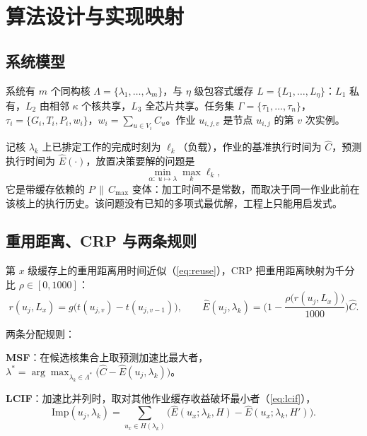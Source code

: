 
\section{算法设计与实现映射} \label{sec:theory}

\subsection{系统模型}

系统有 $m$ 个同构核 $\Lambda=\{\lambda_1,\dots,\lambda_m\}$，与 $\eta$ 级包容式缓存 $L=\{L_1,\dots,L_\eta\}$：$L_1$ 私有，$L_2$ 由相邻 $\kappa$ 个核共享，$L_3$ 全芯片共享。任务集 $\Gamma=\{\tau_1,\dots,\tau_n\}$，$\tau_i=\{G_i,T_i,P_i,w_i\}$，$w_i=\sum_{u\in V_i}C_u$。作业 $u_{i,j,v}$ 是节点 $u_{i,j}$ 的第 $v$ 次实例。

记核 $\lambda_k$ 上已排定工作的完成时刻为 $\ell_k$（负载），作业的基准执行时间为 $\hat{C}$，预测执行时间为 $\hat{E}(\cdot)$，放置决策要解的问题是
\begin{equation}
\min_{\alpha:\;u\mapsto\lambda} \max_k \ell_k,
\end{equation}
它是带缓存依赖的 $P\,\|\,C_{\max}$ 变体：加工时间不是常数，而取决于同一作业此前在该核上的执行历史。该问题没有已知的多项式最优解，工程上只能用启发式。

\subsection{重用距离、CRP 与两条规则}

第 $x$ 级缓存上的重用距离用时间近似（\autoref{eq:reuse}），CRP 把重用距离映射为千分比 $\rho\in[0,1000]$：
\begin{equation}\label{eq:reuse}
r(u_j,L_x)=g\big(t(u_{j,v})-t(u_{j,v-1})\big),\qquad
\hat{E}(u_j,\lambda_k)=\Big(1-\frac{\rho\big(r(u_j,L_x)\big)}{1000}\Big)\hat{C}.
\end{equation}

两条分配规则：

\textbf{MSF}：在候选核集合上取预测加速比最大者，
$\lambda^\ast=\arg\max_{\lambda_k\in\Lambda^\ast}\big(\hat{C}-\hat{E}(u_j,\lambda_k)\big)$。

\textbf{LCIF}：加速比并列时，取对其他作业缓存收益破坏最小者（\autoref{eq:lcif}），
\begin{equation}\label{eq:lcif}
\mathrm{Imp}(u_j,\lambda_k)=\sum_{u_x\in H(\lambda_k)}\Big(\hat{E}(u_x;\lambda_k,H)-\hat{E}(u_x;\lambda_k,H')\Big).
\end{equation}

